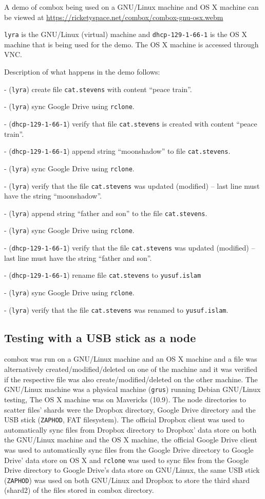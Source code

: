 A demo of combox being used on a GNU/Linux machine and OS X machine
can be viewed at
\url{https://ricketyspace.net/combox/combox-gnu-osx.webm}

\verb+lyra+ is the GNU/Linux (virtual) machine and
\verb+dhcp-129-1-66-1+ is the OS X machine that is being used for the
demo. The OS X machine is accessed through VNC\cite{article:vnc}.

Description of what happens in the demo follows:

- (\verb+lyra+) create file \verb+cat.stevens+ with content ``peace
train''.

- (\verb+lyra+) sync Google Drive using \verb+rclone+.

- (\verb+dhcp-129-1-66-1+) verify that file \verb+cat.stevens+ is
created with content ``peace train''.

- (\verb+dhcp-129-1-66-1+) append string ``moonshadow'' to file
\verb+cat.stevens+.

- (\verb+lyra+) sync Google Drive using \verb+rclone+.

- (\verb+lyra+) verify that the file \verb+cat.stevens+ was updated
(modified) -- last line must have the string ``moonshadow''.

- (\verb+lyra+) append string ``father and son'' to the file
\verb+cat.stevens+.

- (\verb+lyra+) sync Google Drive using \verb+rclone+.

- (\verb+dhcp-129-1-66-1+) verify that the file \verb+cat.stevens+ was
updated (modified) -- last line must have the string ``father and son''.

- (\verb+dhcp-129-1-66-1+) rename file \verb+cat.stevens+ to
\verb+yusuf.islam+

- (\verb+lyra+) sync Google Drive using \verb+rclone+.

- (\verb+lyra+) verify that the file \verb+cat.stevens+ was renamed to
\verb+yusuf.islam+.

\subsection{Testing with a USB stick as a node}

combox was run on a GNU/Linux machine and an OS X machine and a file
was alternatively created/modified/deleted on one of the machine and
it was verified if the respective file was also
create/modified/deleted on the other machine. The GNU/Linux machine
was a physical machine (\verb+grus+) running Debian GNU/Linux testing,
The OS X machine was on Mavericks (10.9). The node directories to
scatter files' shards were the Dropbox directory, Google Drive
directory and the USB stick (\verb+ZAPHOD+, FAT filesystem). The
official Dropbox client was used to automatically sync files from
Dropbox directory to Dropbox' data store on both the GNU/Linux machine
and the OS X machine, the official Google Drive client was used to
automatically sync files from the Google Drive directory to Google
Drive' data store on OS X and \verb+rclone+ \cite{program:rclone} was
used to sync files from the Google Drive directory to Google Drive's
data store on GNU/Linux, the same USB stick (\verb+ZAPHOD+) was used
on both GNU/Linux and Dropbox to store the third shard (shard2) of the
files stored in combox directory.

